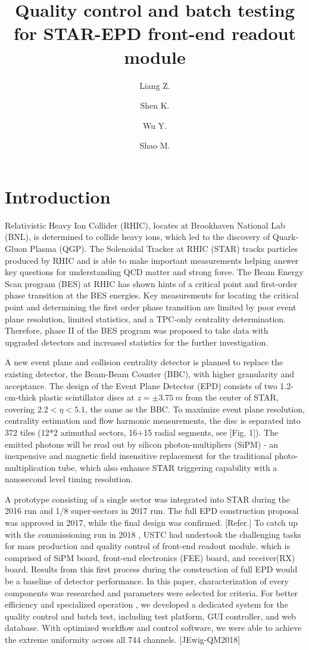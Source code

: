 \documentclass[11pt,a4paper]{article}
\title{Quality control and batch testing for STAR-EPD front-end readout module}
\author[a]{Liang Z.}
\author[a]{Shen K.}
\author[a]{Wu Y.}
\author[a]{Shao M.}
\affiliation[a]{University of Science and Technology of China, JinZhai Road, HEFEI, China}
\begin{document}
\maketitle
\flushbottom

\section{Introduction}
Relativistic Heavy Ion Collider (RHIC), locates at Brookhaven National Lab (BNL), is determined to collide heavy ions, which led to the discovery of Quark-Gluon Plasma (QGP).
The Solenoidal Tracker at RHIC (STAR) tracks particles produced by RHIC and is able to make important measurements helping answer key questions for understanding QCD matter and strong force.
The Beam Energy Scan program (BES) at RHIC has shown hints of a critical point and first-order phase transition at the BES energies.
Key measurements for locating the critical point and determining the first order phase transition are limited by poor event plane resolution, limited statistics, and a TPC-only centrality determination.
Therefore, phase II of the BES program was proposed to take data with upgraded detectors and increased statistics for the further investigation.\cite{pr17}\cite{cyang}

A new event plane and collision centrality detector is planned to replace the existing detector, the Beam-Beam Counter (BBC), with higher granularity and acceptance.
The design of the Event Plane Detector (EPD) consists of two 1.2-cm-thick plastic scintillator discs at $z= \pm 3.75~m$ from the center of STAR, covering $2.2 <\eta< 5.1$, the same as the BBC.
To maximize event plane resolution, centrality estimation and flow harmonic measurements, the disc is separated into 372 tiles (12*2 azimuthal sectors, 16+15 radial segments, see [Fig. 1]).
The emitted photons will be read out by silicon photon-multipliers (SiPM) - an inexpensive and magnetic field insensitive replacement for the traditional photo-multiplication tube, which also enhance STAR triggering capability with a nanosecond level timing resolution.

A prototype consisting of a single sector was integrated into STAR during the 2016 run and 1/8 super-sectors in 2017 run. The full EPD construction proposal was approved in 2017, while the final design was confirmed. [Refer.]
To catch up with the commissioning run in 2018 , USTC had undertook the challenging tasks for mass production and quality control of front-end readout module. which is comprised of SiPM board, front-end electronics (FEE) board, and receiver(RX) board.
Results from this first process during the construction of full EPD would be a baseline of detector performance.
In this paper, characterization of every components was researched and parameters were selected for criteria. For better efficiency and specialized operation , we developed a dedicated system for the quality control and batch test, including test platform, GUI controller, and web database. With optimized workflow and control software, we were able to achieve the extreme uniformity across all 744 channels. [JEwig-QM2018]
\end{document}
